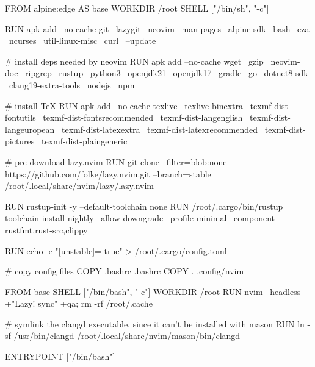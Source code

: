 FROM alpine:edge AS base
WORKDIR /root
SHELL ["/bin/sh", "-c"]

RUN apk add --no-cache git \
                       lazygit \
                       neovim \
                       man-pages \
                       alpine-sdk \
                       bash \
                       eza \
                       ncurses \
                       util-linux-misc \
                       curl \
                       --update

# install deps needed by neovim
RUN apk add --no-cache wget \
                       gzip \
                       neovim-doc \
                       ripgrep \
                       rustup \
                       python3 \
                       openjdk21 \
                       openjdk17 \
                       gradle \
                       go \
                       dotnet8-sdk \
                       clang19-extra-tools \
                       nodejs \
                       npm 

# install TeX
RUN apk add --no-cache texlive \
                       texlive-binextra \
                       texmf-dist-fontutils \
                       texmf-dist-fontsrecommended \
                       texmf-dist-langenglish \
                       texmf-dist-langeuropean \
                       texmf-dist-latexextra \
                       texmf-dist-latexrecommended \
                       texmf-dist-pictures \
                       texmf-dist-plaingeneric 

# pre-download lazy.nvim
RUN git clone --filter=blob:none https://github.com/folke/lazy.nvim.git --branch=stable /root/.local/share/nvim/lazy/lazy.nvim

RUN rustup-init -y --default-toolchain none
RUN /root/.cargo/bin/rustup toolchain install nightly --allow-downgrade --profile minimal --component rustfmt,rust-src,clippy

RUN echo -e "[unstable]\ngc = true" > /root/.cargo/config.toml

# copy config files
COPY .bashrc .bashrc
COPY . .config/nvim

FROM base
SHELL ["/bin/bash", "-c"]
WORKDIR /root
RUN nvim --headless +"Lazy! sync" +qa; rm -rf /root/.cache

# symlink the clangd executable, since it can't be installed with mason
RUN ln -sf /usr/bin/clangd /root/.local/share/nvim/mason/bin/clangd

ENTRYPOINT ["/bin/bash"]

